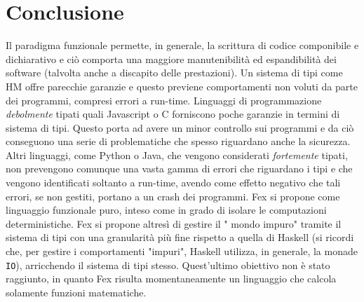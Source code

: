 \documentclass[10pt,a4paper]{article}
\begin{document}
\section{Conclusione}
Il paradigma funzionale permette, in generale, la scrittura di codice componibile e dichiarativo e ciò comporta una
maggiore manutenibilità ed espandibilità dei software (talvolta anche a discapito delle prestazioni). Un sistema di tipi
come HM offre parecchie garanzie e questo previene comportamenti non voluti da parte dei programmi, compresi errori
a run-time. Linguaggi di programmazione \textit{debolmente} tipati quali Javascript o C forniscono poche garanzie in termini
di sistema di tipi. Questo porta ad avere un minor controllo sui programmi e da ciò conseguono una serie di problematiche che
spesso riguardano anche la sicurezza. Altri linguaggi, come Python o Java, che vengono considerati \textit{fortemente} tipati,
non prevengono comunque una vasta gamma di errori che riguardano i tipi e che vengono identificati soltanto a run-time,
avendo come effetto negativo che tali errori, se non gestiti, portano a un crash dei programmi. Fex si propone come linguaggio
funzionale puro, inteso come in grado di isolare le computazioni deterministiche. Fex si propone altresì di gestire il
" mondo impuro" tramite il sistema di tipi con una granularità più fine rispetto a quella di Haskell
(si ricordi che, per gestire i comportamenti "impuri", Haskell utilizza, in generale, la monade \texttt{IO}), arricchendo il
sistema di tipi stesso.
Quest'ultimo obiettivo non è stato raggiunto, in quanto Fex risulta momentaneamente un linguaggio che calcola solamente funzioni
matematiche.
\end{document}
